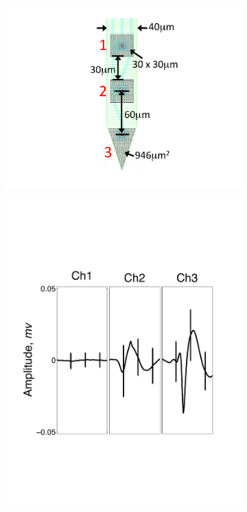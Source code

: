 \begin{center}
\begin{figure}[h!]
\begin{subfigure}[b]{.12\textwidth}
\includegraphics[width=1\textwidth]{../figs/3dev}
\caption{}
\label{3dev}
\end{subfigure}
\begin{subfigure}[b]{.28\textwidth}
\includegraphics[width=\textwidth]{../figs/3devim/clus1}

\end{subfigure}
\end{figure}
\end{center}
